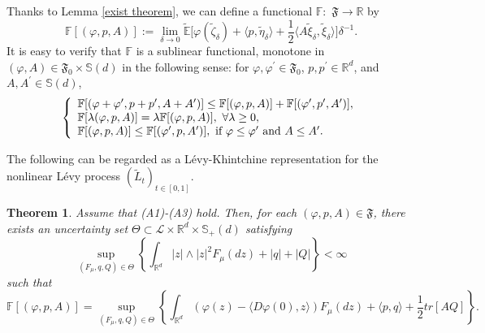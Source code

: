 \documentclass[a4paper,oneside,10pt]{article}%
\newtheorem{theorem}{Theorem}[section]
\numberwithin{equation}{section}
\begin{document}
Thanks to Lemma \ref{exist theorem}, we can define a functional $\mathbb{F}:$
$\mathfrak{F}\mathbb{\rightarrow R}$ by
\[
\mathbb{F}[(\varphi,p,A)]:=\lim_{\delta \rightarrow0}\mathbb{\tilde{E}}
\big[\varphi(\tilde{\zeta}_{\delta})+\langle p,\tilde{\eta}_{\delta}\rangle+
\frac{1}{2}\langle A\tilde{\xi}_{\delta},\tilde{\xi}_{\delta}\rangle
\big]\delta^{-1}.
\]
It is easy to verify that $\mathbb{F}$ is a sublinear functional, monotone in
$(\varphi,A)\in \mathfrak{F}_{0}\times \mathbb{S}(d)$ in the following sense:
for $\varphi,\varphi^{\prime}\in \mathfrak{F}_{0}$, $p,p^{\prime}\in
\mathbb{R}^{d}$, and $A,A^{\prime}\in \mathbb{S}(d)$,
\[
\left \{
\begin{array}
[c]{l}%
\mathbb{F}[(\varphi+\varphi^{\prime},p+p^{\prime},A+A^{\prime})]\leq
\mathbb{F}[(\varphi,p,A)]+\mathbb{F}[(\varphi^{\prime},p^{\prime},A^{\prime
})],\\
\mathbb{F}[\lambda(\varphi,p,A)]=\lambda \mathbb{F}[(\varphi,p,A)],\  \forall
\lambda \geq0,\\
\mathbb{F}[(\varphi,p,A)]\leq \mathbb{F}[(\varphi^{\prime},p,A^{\prime})],
\text{ if }\varphi \leq \varphi^{\prime}\text{\ and }A\leq A^{\prime}.
\end{array}
\right.
\]


The following can be regarded as a L\'evy-Khintchine representation for the
nonlinear L\'evy process $(\tilde{L}_{t})_{t\in[0,1]}$.

\begin{theorem}
\label{represent theorem}Assume that (A1)-(A3) hold. Then, for each
$(\varphi,p,A)\in \mathfrak{F}$, there exists an uncertainty set $\Theta
\subset \mathcal{L}\times \mathbb{R}^{d}\times \mathbb{S}_{+}(d)$ satisfying
\[
\sup_{(F_{\mu},q,Q)\in \Theta}\left \{  \int_{\mathbb{R}^{d}}|z|\wedge
|z|^{2}F_{\mu}(dz)+|q|+|Q|\right \}  <\infty
\]
such that
\[
\mathbb{F}[(\varphi,p,A)]=\sup_{(F_{\mu},q,Q)\in \Theta}\left \{  \int_{
\mathbb{R}^{d}}\left(  \varphi(z)-\langle D\varphi(0),z\rangle \right)  F_{\mu
}(dz)+\langle p,q\rangle+\frac{1}{2}tr[AQ]\right \}  .
\]

\end{theorem}
\end{document}
